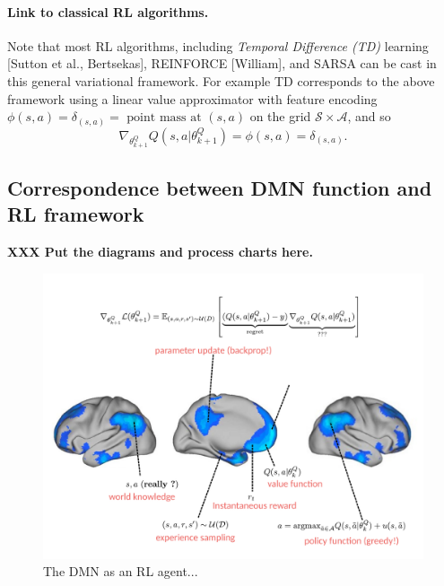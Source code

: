 \documentclass{article} %
\begin{document}
\paragraph{Link to classical RL algorithms.}
Note that most RL algorithms, including \textit{Temporal Difference (TD)}
learning [Sutton et al., Bertsekas], REINFORCE [William], and SARSA can be
cast in this general variational framework. For example TD corresponds to
the above framework using a linear value approximator with feature encoding
$\phi(s,a) = \delta_{(s,a)} =  \text{ point mass at }(s,a)$ on the grid
$\mathcal S \times \mathcal A$, and so
$$\nabla_{\theta^Q_{k+1}}Q(s, a|\theta^Q_{k+1}) = \phi(s, a) = \delta_{(s,a)}.$$

\subsection{Correspondence between DMN function and RL framework}
\textbf{XXX Put the diagrams and process charts here.}
\begin{figure}[!h]
  \includegraphics[width=.9\linewidth]{rl_process_chart.pdf}
  \caption{The DMN as an RL agent...}
  \label{fig:rl_process_chart}
\end{figure}
\end{document}
